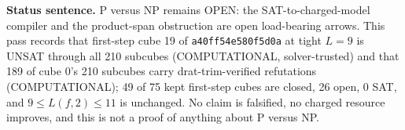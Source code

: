 \documentclass[11pt]{article}
\begin{document}
\bigskip
\noindent\textbf{Status sentence.} P versus NP remains OPEN: the SAT-to-charged-model compiler and the product-span obstruction are open load-bearing arrows. This pass records that first-step cube 19 of \texttt{a40ff54e580f5d0a} at tight $L=9$ is UNSAT through all 210 subcubes (COMPUTATIONAL, solver-trusted) and that 189 of cube 0's 210 subcubes carry drat-trim-verified refutations (COMPUTATIONAL); 49 of 75 kept first-step cubes are closed, 26 open, 0 SAT, and $9\le L(f,2)\le 11$ is unchanged. No claim is falsified, no charged resource improves, and this is not a proof of anything about P versus NP.
\end{document}
